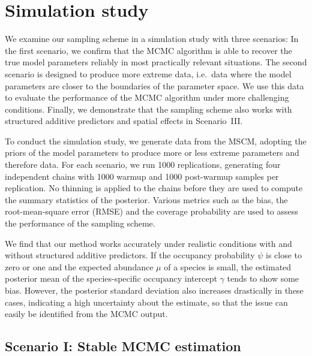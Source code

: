 \documentclass{article}
\begin{document}
\section{Simulation study}
\label{sec:simulation}

We examine our sampling scheme in a simulation study with three scenarios: In the first scenario, we confirm that the MCMC algorithm is able to recover the true model parameters reliably in most practically relevant situations. The second scenario is designed to produce more extreme data, i.e.~data where the model parameters are closer to the boundaries of the parameter space. We use this data to evaluate the performance of the MCMC algorithm under more challenging conditions. Finally, we demonstrate that the sampling scheme also works with structured additive predictors and spatial effects in Scenario~III.

To conduct the simulation study, we generate data from the MSCM, adopting the priors of the model parameters to produce more or less extreme parameters and therefore data. For each scenario, we run 1000 replications, generating four independent chains with 1000 warmup and 1000 post-warmup samples per replication. No thinning is applied to the chains before they are used to compute the summary statistics of the posterior. Various metrics such as the bias, the root-mean-square error (RMSE) and the coverage probability are used to assess the performance of the sampling scheme.

We find that our method works accurately under realistic conditions with and without structured additive predictors. If the occupancy probability $\psi$ is close to zero or one and the expected abundance $\mu$ of a species is small, the estimated posterior mean of the species-specific occupancy intercept $\gamma$ tends to show some bias. However, the posterior standard deviation also increases drastically in these cases, indicating a high uncertainty about the estimate, so that the issue can easily be identified from the MCMC output.

\subsection{Scenario I: Stable MCMC estimation}
\end{document}
